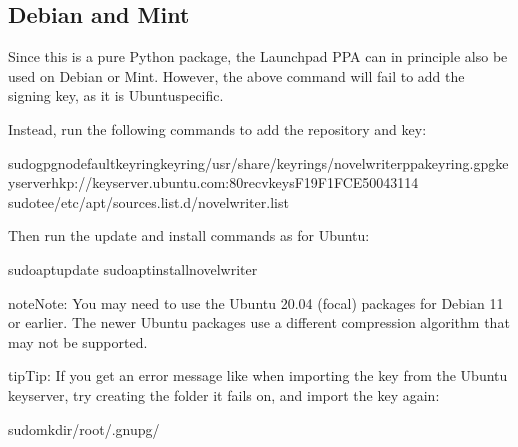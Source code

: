 \documentclass[a4paper,11pt,english]{sphinxmanual}
\begin{document}
\subsection{Debian and Mint}
\label{\detokenize{int_started:debian-and-mint}}
\sphinxAtStartPar
Since this is a pure Python package, the Launchpad PPA can in principle also be used on Debian or
Mint. However, the above command will fail to add the signing key, as it is Ubuntu\sphinxhyphen{}specific.

\sphinxAtStartPar
Instead, run the following commands to add the repository and key:

\begin{sphinxVerbatim}[commandchars=\\\{\}]
sudogpg\PYGZhy{}\PYGZhy{}no\PYGZhy{}default\PYGZhy{}keyring\PYGZhy{}\PYGZhy{}keyring/usr/share/keyrings/novelwriter\PYGZhy{}ppa\PYGZhy{}keyring.gpg\PYGZhy{}\PYGZhy{}keyserverhkp://keyserver.ubuntu.com:80\PYGZhy{}\PYGZhy{}recv\PYGZhy{}keysF19F1FCE50043114
sudotee/etc/apt/sources.list.d/novelwriter.list
\end{sphinxVerbatim}

\sphinxAtStartPar
Then run the update and install commands as for Ubuntu:

\begin{sphinxVerbatim}[commandchars=\\\{\}]
sudoaptupdate
sudoaptinstallnovelwriter
\end{sphinxVerbatim}

\begin{sphinxadmonition}{note}{Note:}
\sphinxAtStartPar
You may need to use the Ubuntu 20.04 (focal) packages for Debian 11 or earlier. The newer Ubuntu
packages use a different compression algorithm that may not be supported.
\end{sphinxadmonition}

\begin{sphinxadmonition}{tip}{Tip:}
\sphinxAtStartPar
If you get an error message like  when importing the key
from the Ubuntu keyserver, try creating the folder it fails on, and import the key again:

\begin{sphinxVerbatim}[commandchars=\\\{\}]
sudomkdir/root/.gnupg/
\end{sphinxVerbatim}
\end{sphinxadmonition}
\end{document}
